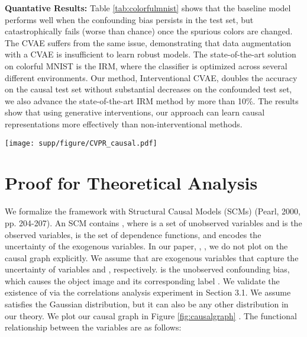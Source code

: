 \documentclass[final]{cvpr}
\begin{document}
\begin{subappendices}
\textbf{Quantative Results: } Table \ref{tab:colorfulmnist} shows that the baseline model performs well when the confounding bias persists in the test set, but catastrophically fails (worse than chance) once the spurious colors are changed. The CVAE suffers from the same issue, demonstrating that data augmentation with a CVAE is insufficient to learn robust models. The state-of-the-art solution on colorful MNIST is the IRM, where the classifier is optimized across several different environments. Our method, Interventional CVAE, doubles the accuracy on the causal test set without substantial decreases on the confounded test set, we also advance the state-of-the-art IRM method by more than 10\%. The results show that using generative interventions, our approach can learn causal representations more effectively than non-interventional methods.






 \begin{figure*}[t]
  \centering
  \texttt{[image: supp/figure/CVPR\_causal.pdf]}
\caption{Causal graph for image classification. Gray variables are observed. (\textbf{a})  is the unobserved variable that generates the object features. The unobserved confounder  causes both the  background features  and label , which creates a spurious correlation between the image  and label . (\textbf{b}) An ideal intervention blocks the backdoor path from  to , which produces causal models. (\textbf{c}) In practice, we cannot guarantee to intervene on all the  variables. However, by properly intervening on even a small set of nuisance factors , the confounding bias of the observed distribution is mitigated, which is theoretically proven by our theorem.}

  \label{fig:causalgraph}
\end{figure*}


\section{Proof for Theoretical Analysis}


We formalize the framework with Structural Causal Models (SCMs) (Pearl, 2000, pp. 204-207). An SCM contains , where  is a set of unobserved variables and  is the observed variables,  is the set of dependence functions, and  encodes the uncertainty of the exogenous variables. In our paper, , , we do not plot  on the causal graph explicitly. We assume that  are exogenous variables that capture the uncertainty of variables  and , respectively.   is the unobserved confounding bias, which causes the object image  and its corresponding label .  We validate the existence of  via the correlations analysis experiment in Section 3.1. We assume  satisfies the Gaussian distribution, but it can also be any other distribution in our theory. We plot our causal graph in Figure \ref{fig:causalgraph}
.
The functional relationship  between the variables are as follows:






\end{subappendices}
\end{document}
